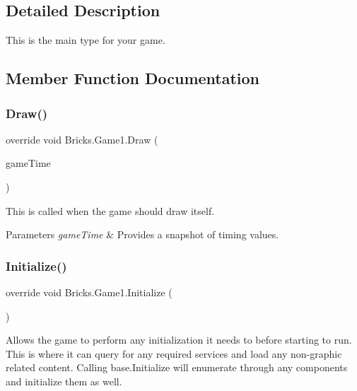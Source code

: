 \subsection{Detailed Description}
This is the main type for your game. 



\subsection{Member Function Documentation}
\mbox{\label{class_bricks_1_1_game1_a0c3afe7c740c0afc3e5fc0debbf2b652}} 
\subsubsection{\texorpdfstring{Draw()}{Draw()}}
{\footnotesize\ttfamily override void Bricks.\+Game1.\+Draw (\begin{DoxyParamCaption}\item[{Game\+Time}]{game\+Time }\end{DoxyParamCaption})\hspace{0.3cm}{\ttfamily [protected]}}



This is called when the game should draw itself. 


\begin{DoxyParams}{Parameters}
{\em game\+Time} & Provides a snapshot of timing values.\\
\hline
\end{DoxyParams}
\mbox{\label{class_bricks_1_1_game1_a824a8dccf60f81693107567595d6c279}} 
\subsubsection{\texorpdfstring{Initialize()}{Initialize()}}
{\footnotesize\ttfamily override void Bricks.\+Game1.\+Initialize (\begin{DoxyParamCaption}{ }\end{DoxyParamCaption})\hspace{0.3cm}{\ttfamily [protected]}}



Allows the game to perform any initialization it needs to before starting to run. This is where it can query for any required services and load any non-\/graphic related content. Calling base.\+Initialize will enumerate through any components and initialize them as well. 

